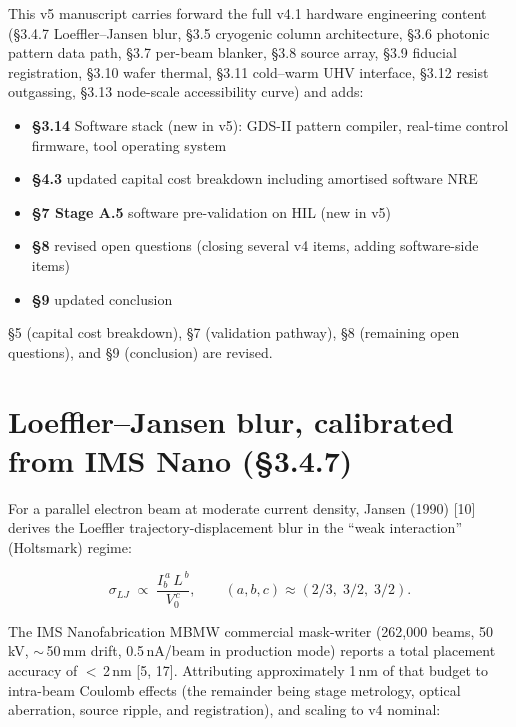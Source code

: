 \documentclass[11pt,letterpaper]{article}
\begin{document}
This v5 manuscript carries forward the full v4.1 hardware engineering content (\S 3.4.7 Loeffler--Jansen blur, \S 3.5 cryogenic column architecture, \S 3.6 photonic pattern data path, \S 3.7 per-beam blanker, \S 3.8 source array, \S 3.9 fiducial registration, \S 3.10 wafer thermal, \S 3.11 cold--warm UHV interface, \S 3.12 resist outgassing, \S 3.13 node-scale accessibility curve) and adds:

\begin{itemize}[leftmargin=1.6em]
  \item \textbf{\S 3.14} Software stack (new in v5): GDS-II pattern compiler, real-time control firmware, tool operating system
  \item \textbf{\S 4.3} updated capital cost breakdown including amortised software NRE
  \item \textbf{\S 7 Stage A.5} software pre-validation on HIL (new in v5)
  \item \textbf{\S 8} revised open questions (closing several v4 items, adding software-side items)
  \item \textbf{\S 9} updated conclusion
\end{itemize}

\S 5 (capital cost breakdown), \S 7 (validation pathway), \S 8 (remaining open questions), and \S 9 (conclusion) are revised.

\section{Loeffler--Jansen blur, calibrated from IMS Nano (\S 3.4.7)}

For a parallel electron beam at moderate current density, Jansen (1990) [10] derives the Loeffler trajectory-displacement blur in the ``weak interaction'' (Holtsmark) regime:

\begin{equation}
\sigma_{LJ} \;\propto\; \frac{I_b^{\,a}\,L^{\,b}}{V_0^{\,c}}, \qquad (a,b,c) \approx (2/3,\;3/2,\;3/2).
\end{equation}

The IMS Nanofabrication MBMW commercial mask-writer (262,000 beams, 50\,kV, $\sim$\,50\,mm drift, 0.5\,nA/beam in production mode) reports a total placement accuracy of $<$\,2\,nm [5, 17]. Attributing approximately 1\,nm of that budget to intra-beam Coulomb effects (the remainder being stage metrology, optical aberration, source ripple, and registration), and scaling to v4 nominal:
\end{document}
